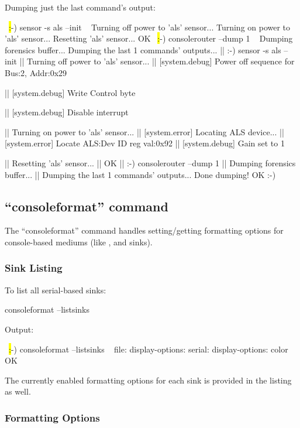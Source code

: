 Dumping just the last command's output:

\begin{LuaCode}
~\hl:-) sensor -s als --init ~
Turning off power to 'als' sensor...
Turning on power to 'als' sensor...
Resetting 'als' sensor...
OK
~\hl:-) consolerouter --dump 1 ~
Dumping forensics buffer...
Dumping the last 1 commands' outputs...
|| :-) sensor -s als --init
|| Turning off power to 'als' sensor...
|| [system.debug] Power off sequence for Bus:2, Addr:0x29

|| [system.debug] Write Control byte

|| [system.debug] Disable interrupt

|| Turning on power to 'als' sensor...
|| [system.error] Locating ALS device...
|| [system.error] Locate ALS:Dev ID reg val:0x92
|| [system.debug] Gain set to 1 

|| Resetting 'als' sensor...
|| OK
|| :-) consolerouter --dump 1
|| Dumping forensics buffer...
|| Dumping the last 1 commands' outputs...
Done dumping!
OK
:-) 
\end{LuaCode}

\subsection{``consoleformat'' command}

The ``consoleformat'' command handles setting/getting formatting options for console-based mediums (like ,  and  sinks). 

\subsubsection{Sink Listing}

To list all serial-based sinks:

\begin{CommandLine}
consoleformat --listsinks
\end{CommandLine}

Output:

\begin{LuaCode}
~\hl:-) consoleformat --listsinks ~
file:
	display-options: 
serial:
	display-options: color
OK
\end{LuaCode}

The currently enabled formatting options for each sink is provided in the listing as well. 

\subsubsection{Formatting Options}

